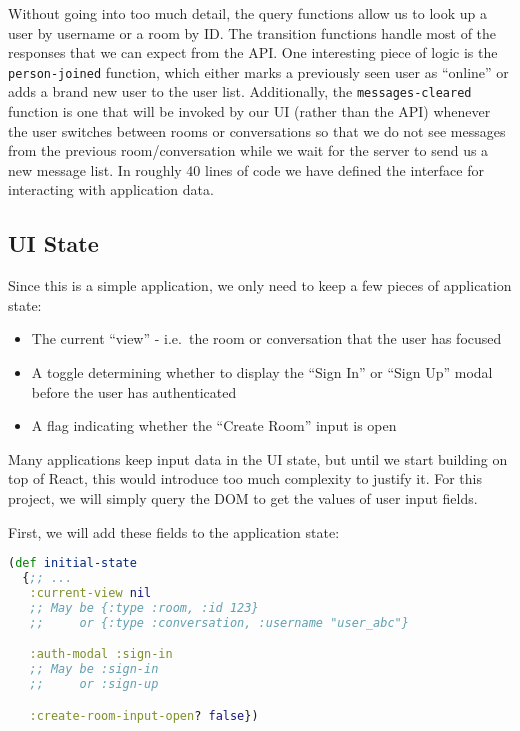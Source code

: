 \documentclass[10pt,twoside,openright]{memoir}
\begin{document}
Without going into too much detail, the query functions allow us to look
up a user by username or a room by ID. The transition functions handle
most of the responses that we can expect from the API. One interesting
piece of logic is the \texttt{person-joined} function, which either
marks a previously seen user as ``online'' or adds a brand new user to
the user list. Additionally, the \texttt{messages-cleared} function is
one that will be invoked by our UI (rather than the API) whenever the
user switches between rooms or conversations so that we do not see
messages from the previous room/conversation while we wait for the
server to send us a new message list. In roughly 40 lines of code we
have defined the interface for interacting with application data.


\subsection{UI State}

Since this is a simple application, we only need to keep a few pieces of
application state:

\begin{itemize}
\tightlist
\item
  The current ``view'' - i.e.~the room or conversation that the user has
  focused
\item
  A toggle determining whether to display the ``Sign In'' or ``Sign Up''
  modal before the user has authenticated
\item
  A flag indicating whether the ``Create Room'' input is open
\end{itemize}

Many applications keep input data in the UI state, but until we start
building on top of React, this would introduce too much complexity to
justify it. For this project, we will simply query the DOM to get the
values of user input fields.

First, we will add these fields to the application state:

\begin{lstlisting}[language=Clojure]
(def initial-state
  {;; ...
   :current-view nil
   ;; May be {:type :room, :id 123}
   ;;     or {:type :conversation, :username "user_abc"}

   :auth-modal :sign-in
   ;; May be :sign-in
   ;;     or :sign-up

   :create-room-input-open? false})
\end{lstlisting}
\end{document}

